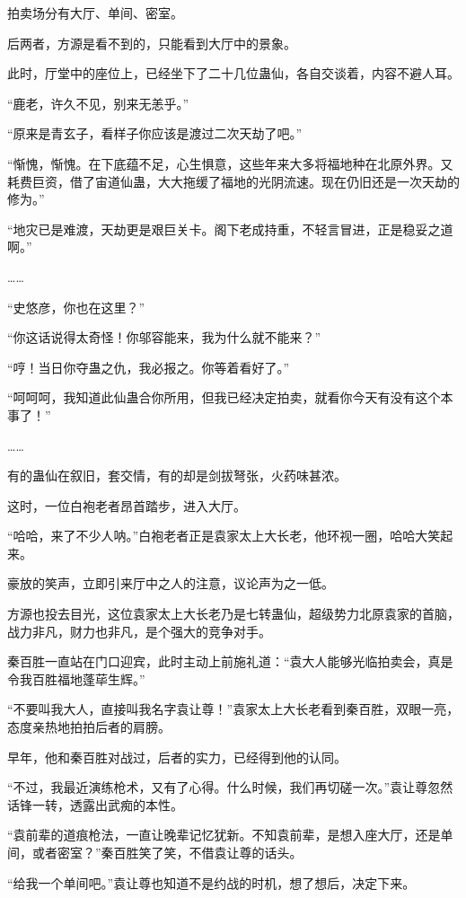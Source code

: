 \begin{this_body}
拍卖场分有大厅、单间、密室。

后两者，方源是看不到的，只能看到大厅中的景象。

此时，厅堂中的座位上，已经坐下了二十几位蛊仙，各自交谈着，内容不避人耳。

“鹿老，许久不见，别来无恙乎。”

“原来是青玄子，看样子你应该是渡过二次天劫了吧。”

“惭愧，惭愧。在下底蕴不足，心生惧意，这些年来大多将福地种在北原外界。又耗费巨资，借了宙道仙蛊，大大拖缓了福地的光阴流速。现在仍旧还是一次天劫的修为。”

“地灾已是难渡，天劫更是艰巨关卡。阁下老成持重，不轻言冒进，正是稳妥之道啊。”

……

“史悠彦，你也在这里？”

“你这话说得太奇怪！你邬容能来，我为什么就不能来？”

“哼！当日你夺蛊之仇，我必报之。你等着看好了。”

“呵呵呵，我知道此仙蛊合你所用，但我已经决定拍卖，就看你今天有没有这个本事了！”

……

有的蛊仙在叙旧，套交情，有的却是剑拔弩张，火药味甚浓。

这时，一位白袍老者昂首踏步，进入大厅。

“哈哈，来了不少人呐。”白袍老者正是袁家太上大长老，他环视一圈，哈哈大笑起来。

豪放的笑声，立即引来厅中之人的注意，议论声为之一低。

方源也投去目光，这位袁家太上大长老乃是七转蛊仙，超级势力北原袁家的首脑，战力非凡，财力也非凡，是个强大的竞争对手。

秦百胜一直站在门口迎宾，此时主动上前施礼道：“袁大人能够光临拍卖会，真是令我百胜福地蓬荜生辉。”

“不要叫我大人，直接叫我名字袁让尊！”袁家太上大长老看到秦百胜，双眼一亮，态度亲热地拍拍后者的肩膀。

早年，他和秦百胜对战过，后者的实力，已经得到他的认同。

“不过，我最近演练枪术，又有了心得。什么时候，我们再切磋一次。”袁让尊忽然话锋一转，透露出武痴的本性。

“袁前辈的道痕枪法，一直让晚辈记忆犹新。不知袁前辈，是想入座大厅，还是单间，或者密室？”秦百胜笑了笑，不借袁让尊的话头。

“给我一个单间吧。”袁让尊也知道不是约战的时机，想了想后，决定下来。


\end{this_body}
